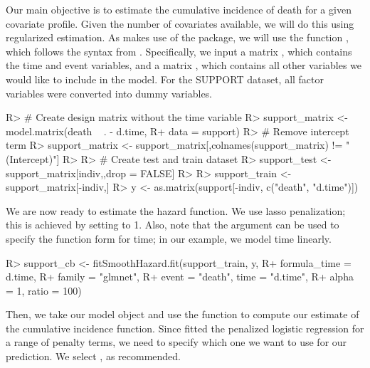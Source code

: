 \documentclass[
]{jss}
\begin{document}
Our main objective is to estimate the cumulative incidence of death for
a given covariate profile. Given the number of covariates available, we
will do this using regularized estimation. As  makes use
of the  package, we will use the function
, which follows the syntax from .
Specifically, we input a matrix , which contains the time and
event variables, and a matrix , which contains all other
variables we would like to include in the model. For the SUPPORT
dataset, all factor variables were converted into dummy variables.

\begin{CodeChunk}

\begin{CodeInput}
R> # Create design matrix without the time variable
R> support_matrix <- model.matrix(death ~ . - d.time, 
R+                                data = support)
R> # Remove intercept term
R> support_matrix <- support_matrix[,colnames(support_matrix) != "(Intercept)"]
R> 
R> # Create test and train dataset
R> support_test <- support_matrix[indiv,,drop = FALSE]
R> 
R> support_train <- support_matrix[-indiv,]
R> y <- as.matrix(support[-indiv, c("death", "d.time")])
\end{CodeInput}
\end{CodeChunk}

We are now ready to estimate the hazard function. We use lasso
penalization; this is achieved by setting  to 1. Also, note
that the argument  can be used to specify the
function form for time; in our example, we model time linearly.

\begin{CodeChunk}

\begin{CodeInput}
R> support_cb <- fitSmoothHazard.fit(support_train, y, 
R+                                   formula_time = ~ d.time, 
R+                                   family = "glmnet", 
R+                                   event = "death", time = "d.time", 
R+                                   alpha = 1, ratio = 100)
\end{CodeInput}
\end{CodeChunk}

Then, we take our model object and use the  function
to compute our estimate of the cumulative incidence function. Since
 fitted the penalized logistic regression for a range of
penalty terms, we need to specify which one we want to use for our
prediction. We select , as recommended.
\end{document}
